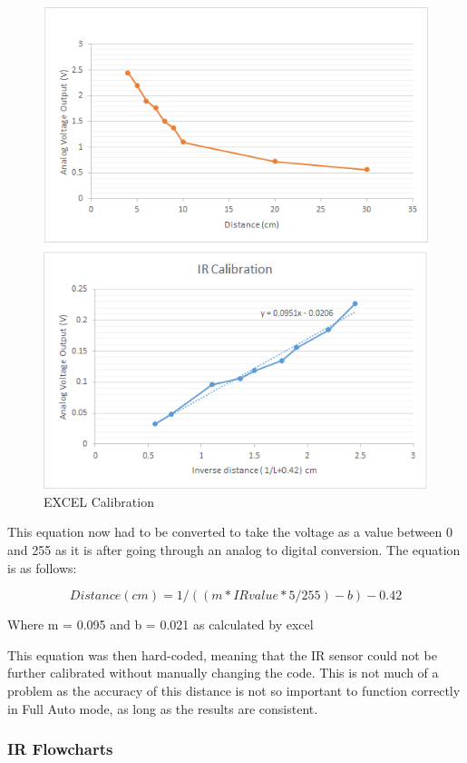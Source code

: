 \documentclass{article}
\begin{document}
\begin{figure}[h]
	\includegraphics[scale=1]{IR_calibration.png}
	\centering
	\caption{EXCEL Calibration}
\end{figure}

This equation now had to be converted to take the voltage as a value between 0 and 255 as it is after going through an analog to digital conversion. The equation is as follows:

\begin{equation}
Distance (cm) = 1/((m*IRvalue*5/255)-b)-0.42
\end{equation}

Where m = 0.095 and b = 0.021 as calculated by excel

This equation was then hard-coded, meaning that the IR sensor could not be further calibrated without manually changing the code. This is not much of a problem as the accuracy of this distance is not so important to function correctly in Full Auto mode, as long as the results are consistent. 

\subsubsection{IR Flowcharts}
\end{document}
